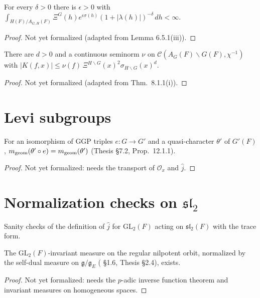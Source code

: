 \begin{lemma}
\label{lemma_6_5_1_iii}
\leanok
{}
For every $\delta>0$ there is $\epsilon>0$ with
$\int_{H(F)/A_{G,H}(F)}\Xi^G(h)e^{\epsilon\sigma(h)}(1+|\lambda(h)|)^{-\delta}\,dh<\infty$.
\end{lemma}
\begin{proof}
Not yet formalized (adapted from \cite{BP} Lemma 6.5.1(iii)).
\end{proof}

\begin{theorem}
\label{kernelK_bound}
\leanok
{}
There are $d>0$ and a continuous seminorm $\nu$ on $\mathcal C(A_G(F)\backslash G(F),\chi^{-1})$ with
$|K(f,x)|\le\nu(f)\,\Xi^{H\backslash G}(x)^2\sigma_{H\backslash G}(x)^{d}$.
\end{theorem}
\begin{proof}
Not yet formalized (adapted from \cite{BP} Thm.~8.1.1(i)).
\end{proof}

\section{Levi subgroups}
\begin{lemma}
\label{mGeom_congr_iso}
\leanok
{}
For an isomorphism of GGP triples $e:G\to G'$ and a quasi-character $\theta'$ of $G'(F)$,
$m_{\mathrm{geom}}(\theta'\circ e)=m_{\mathrm{geom}}(\theta')$ (Thesis \S7.2, Prop.~12.1.1).
\end{lemma}
\begin{proof}
Not yet formalized: needs the transport of $\mathcal O_x$ and $\hat j$.
\end{proof}

\section{\texorpdfstring{Normalization checks on $\mathfrak{sl}_2$}{Normalization checks on sl 2}}
Sanity checks of the definition of $\hat j$ for $\mathrm{GL}_2(F)$
acting on $\mathfrak{sl}_2(F)$ with the trace form.

\begin{lemma}
\label{exists_isOrbitMeasure_regOrbit}
\leanok
The $\mathrm{GL}_2(F)$-invariant measure on the regular nilpotent orbit, normalized by the self-dual measure on
$\mathfrak g/\mathfrak g_E$ (\cite{BP} \S1.6, Thesis \S2.4), exists.
\end{lemma}
\begin{proof}
Not yet formalized: needs the $p$-adic inverse function theorem and invariant measures on homogeneous spaces.
\end{proof}

